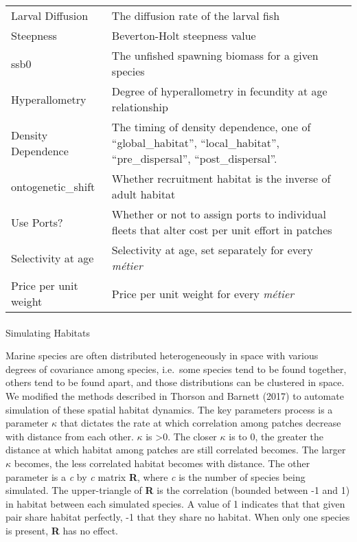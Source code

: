 \documentclass[
  default,
  lineno,
  referee]{sn-jnl}
\makeatletter
\let\oldparagraph\paragraph
\renewcommand{\paragraph}{
    \@ifstar
      \xxxParagraphStar
      \xxxParagraphNoStar
  }
\newcommand{\xxxParagraphStar}[1]{\oldparagraph*{#1}\mbox{}}
\newcommand{\xxxParagraphNoStar}[1]{\oldparagraph{#1}\mbox{}}
\makeatother
\begin{document}
\begin{longtable}[]{@{}
  >{\raggedright\arraybackslash}p{}
  >{\raggedright\arraybackslash}p{}@{}}
Larval Diffusion & The diffusion rate of the larval fish \\
Steepness & Beverton-Holt steepness value \\
ssb0 & The unfished spawning biomass for a given species \\
Hyperallometry & Degree of hyperallometry in fecundity at age
relationship \\
Density Dependence & The timing of density dependence, one of
``global\_habitat'', ``local\_habitat'', ``pre\_dispersal'',
``post\_dispersal''. \\
ontogenetic\_shift & Whether recruitment habitat is the inverse of adult
habitat \\
Use Ports? & Whether or not to assign ports to individual fleets that
alter cost per unit effort in patches \\
Selectivity at age & Selectivity at age, set separately for every
\emph{métier} \\
Price per unit weight & Price per unit weight for every \emph{métier} \\
\end{longtable}

\paragraph{Simulating Habitats}\label{simulating-habitats}

Marine species are often distributed heterogeneously in space with
various degrees of covariance among species, i.e.~some species tend to
be found together, others tend to be found apart, and those
distributions can be clustered in space. We modified the methods
described in Thorson and Barnett (2017) to automate simulation of these
spatial habitat dynamics. The key parameters process is a parameter
\(\kappa\) that dictates the rate at which correlation among patches
decrease with distance from each other. \(\kappa\) is \textgreater0. The
closer \(\kappa\) is to 0, the greater the distance at which habitat
among patches are still correlated becomes. The larger \(\kappa\)
becomes, the less correlated habitat becomes with distance. The other
parameter is a \emph{c} by \emph{c} matrix \textbf{R}, where \emph{c} is
the number of species being simulated. The upper-triangle of \textbf{R}
is the correlation (bounded between -1 and 1) in habitat between each
simulated species. A value of 1 indicates that that given pair share
habitat perfectly, -1 that they share no habitat. When only one species
is present, \textbf{R} has no effect.
\end{document}
